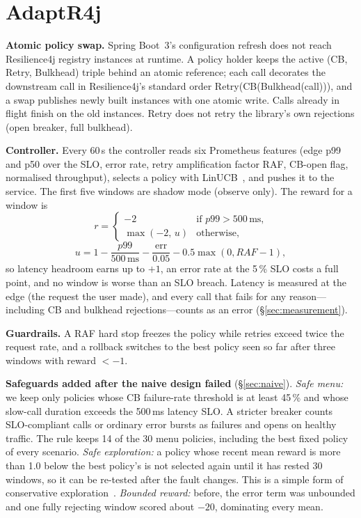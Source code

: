 \documentclass[journal]{IEEEtran}
\newcommand{\rFJ}{Resilience4j\xspace}
\newcommand{\raf}{RAF\xspace}
\begin{document}
\section{AdaptR4j}
\label{sec:design}

\textbf{Atomic policy swap.} Spring Boot~3's configuration refresh does not reach \rFJ
registry instances at runtime. A policy holder keeps the active (CB, Retry, Bulkhead) triple
behind an atomic reference; each call decorates the downstream call in \rFJ's standard order
Retry(CB(Bulkhead(call))), and a swap publishes newly built instances with one atomic write.
Calls already in flight finish on the old instances. Retry does not retry the library's own
rejections (open breaker, full bulkhead).

\textbf{Controller.} Every 60\,s the controller reads six Prometheus features (edge p99 and
p50 over the SLO, error rate, retry amplification factor \raf, CB-open flag, normalised
throughput), selects a policy with LinUCB~\cite{li2010}, and pushes it to the service. The
first five windows are shadow mode (observe only). The reward for a window is
\[
  r = \begin{cases}
    -2 & \text{if } p99 > 500\,\text{ms,}\\
    \max(-2,\, u) & \text{otherwise,}
  \end{cases}
\]
\[
  u = 1 - \frac{p99}{500\,\text{ms}} - \frac{\text{err}}{0.05} - 0.5\max(0,\raf-1),
\]
so latency headroom earns up to $+1$, an error rate at the 5\,\% SLO costs a full point, and no
window is worse than an SLO breach. Latency is measured at the edge (the request the user
made), and every call that fails for any reason---including CB and bulkhead rejections---counts
as an error (\S\ref{sec:measurement}).

\textbf{Guardrails.} A RAF hard stop freezes the policy while retries exceed twice the request
rate, and a rollback switches to the best policy seen so far after three windows with
reward $<-1$.

\textbf{Safeguards added after the naive design failed} (\S\ref{sec:naive}).
\emph{Safe menu:} we keep only policies whose CB failure-rate threshold is at least 45\,\%
and whose slow-call duration exceeds the 500\,ms latency SLO. A stricter breaker counts
SLO-compliant calls or ordinary error bursts as failures and opens on healthy traffic. The
rule keeps 14 of the 30 menu policies, including the best fixed policy of every scenario.
\emph{Safe exploration:} a policy whose recent mean reward is more than 1.0 below the best
policy's is not selected again until it has rested 30 windows, so it can be re-tested after
the fault changes. This is a simple form of conservative exploration~\cite{wu2016conservative,garcia2015}.
\emph{Bounded reward:} before, the error term was unbounded and one fully rejecting window
scored about $-20$, dominating every mean.
\end{document}
